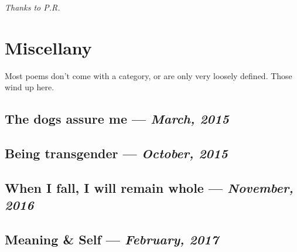 \documentclass[12pt,letterpaper,oneside]{memoir}
\begin{document}
  

  \textit{Thanks to P.R.}
  \newpage


  \chapter{Miscellany}

  Most poems don't come with a category, or are only very loosely defined. Those wind up here.
  \newpage


  \section{The dogs assure me --- \textit{March, 2015}}

  
  \newpage


  \section{Being transgender --- \textit{October, 2015}}

  
  \newpage


  \section{When I fall, I will remain whole --- \textit{November, 2016}}

  
  \newpage


  \section{Meaning \& Self --- \textit{February, 2017}}

  
  \newpage
\end{document}
